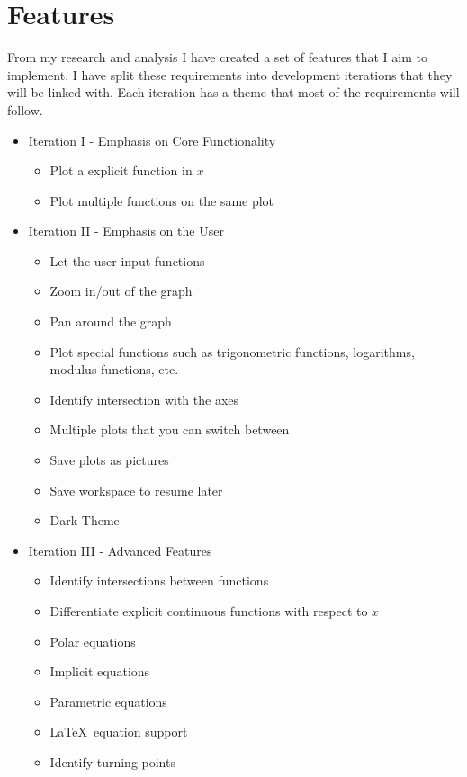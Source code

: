 \documentclass[../../../main.tex]{subfiles}
\begin{document}
\chapter{Features}
From my research and analysis I have created a set of features that I aim to implement. I have split these requirements into development iterations that they will be linked with. Each iteration has a theme that most of the requirements will follow.
\begin{itemize}
	\item Iteration I - Emphasis on Core Functionality
		\begin{itemize}
			\item Plot a explicit function in $x$
			\item Plot multiple functions on the same plot
		\end{itemize}
	\item Iteration II - Emphasis on the User
		\begin{itemize}
			\item Let the user input functions
			\item Zoom in/out of the graph
			\item Pan around the graph
			\item Plot special functions such as trigonometric functions, logarithms, modulus functions, etc.
			\item Identify intersection with the axes
			\item Multiple plots that you can switch between
			\item Save plots as pictures
			\item Save workspace to resume later
			\item Dark Theme
		\end{itemize}
	\item Iteration III - Advanced Features
		\begin{itemize}
			\item Identify intersections between functions
			\item Differentiate explicit continuous functions with respect to $x$
			\item Polar equations
			\item Implicit equations
			\item Parametric equations
			\item \LaTeX \ equation support
			\item Identify turning points 
		\end{itemize}
\end{itemize}
\end{document}
